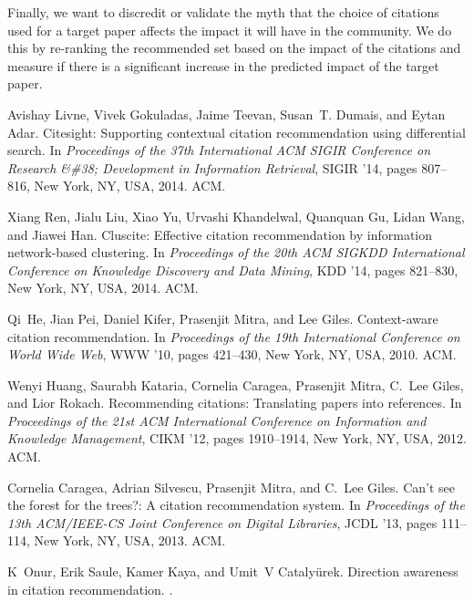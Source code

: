 \documentclass[journal]{IEEEtran}
\begin{document}
Finally, we want to discredit or validate the myth that the choice of citations used for a target paper affects the impact it will have in the community.  We do this by re-ranking the recommended set based on the impact of the citations and measure if there is a significant increase in the predicted impact of the target paper. 

\begin{thebibliography}{1}

Avishay Livne, Vivek Gokuladas, Jaime Teevan, Susan~T. Dumais, and Eytan Adar.
\newblock Citesight: Supporting contextual citation recommendation using
  differential search.
\newblock In {\em Proceedings of the 37th International ACM SIGIR Conference on
  Research \&\#38; Development in Information Retrieval}, SIGIR '14, pages
  807--816, New York, NY, USA, 2014. ACM.

Xiang Ren, Jialu Liu, Xiao Yu, Urvashi Khandelwal, Quanquan Gu, Lidan Wang, and
  Jiawei Han.
\newblock Cluscite: Effective citation recommendation by information
  network-based clustering.
\newblock In {\em Proceedings of the 20th ACM SIGKDD International Conference
  on Knowledge Discovery and Data Mining}, KDD '14, pages 821--830, New York,
  NY, USA, 2014. ACM.

Qi~He, Jian Pei, Daniel Kifer, Prasenjit Mitra, and Lee Giles.
\newblock Context-aware citation recommendation.
\newblock In {\em Proceedings of the 19th International Conference on World
  Wide Web}, WWW '10, pages 421--430, New York, NY, USA, 2010. ACM.

Wenyi Huang, Saurabh Kataria, Cornelia Caragea, Prasenjit Mitra, C.~Lee Giles,
  and Lior Rokach.
\newblock Recommending citations: Translating papers into references.
\newblock In {\em Proceedings of the 21st ACM International Conference on
  Information and Knowledge Management}, CIKM '12, pages 1910--1914, New York,
  NY, USA, 2012. ACM.

Cornelia Caragea, Adrian Silvescu, Prasenjit Mitra, and C.~Lee Giles.
\newblock Can't see the forest for the trees?: A citation recommendation
  system.
\newblock In {\em Proceedings of the 13th ACM/IEEE-CS Joint Conference on
  Digital Libraries}, JCDL '13, pages 111--114, New York, NY, USA, 2013. ACM.

K~Onur, Erik Saule, Kamer Kaya, and Umit~V Cataly{\"u}rek.
\newblock Direction awareness in citation recommendation.
.


\end{thebibliography}
\end{document}
